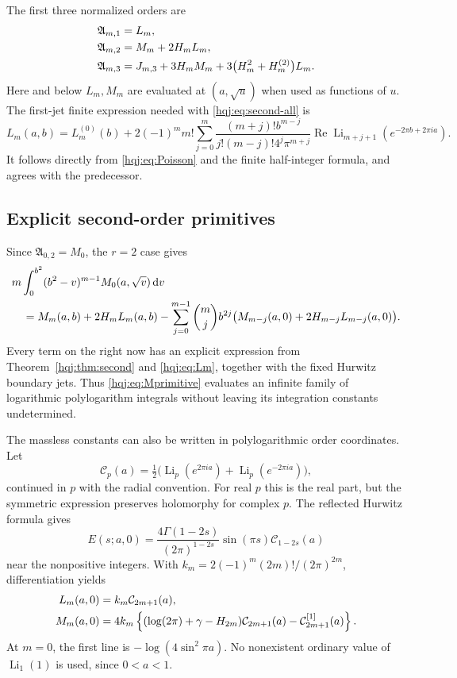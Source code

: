 \documentclass[11pt,letterpaper]{article}
\numberwithin{equation}{section}
\theoremstyle{definition}
\newcommand{\Li}{\operatorname{Li}}
\newcommand{\Rea}{\operatorname{Re}}
\newcommand{\dd}{\,\mathrm{d}}
\begin{document}
The first three normalized orders are
\begin{align}
\mathfrak A_{m,1}&=L_m,\notag\\
\mathfrak A_{m,2}&=M_m+2H_mL_m,\label{hqj:eq:normalized-low}\\
\mathfrak A_{m,3}&=J_{m,3}+3H_mM_m
+3\bigl(H_m^2+H_m^{(2)}\bigr)L_m.\notag
\end{align}
Here and below $L_m,M_m$ are evaluated at $(a,\sqrt u)$ when used as
functions of $u$. The first-jet finite expression needed with
\eqref{hqj:eq:second-all} is
\begin{equation}\label{hqj:eq:Lm}
L_m(a,b)=L_m^{(0)}(b)+2(-1)^m m!
\sum_{j=0}^m\frac{(m+j)!b^{m-j}}{j!(m-j)!4^j\pi^{m+j}}
\Rea\Li_{m+j+1}(e^{-2\pi b+2\pi ia}).
\end{equation}
It follows directly from \eqref{hqj:eq:Poisson} and the finite
half-integer formula, and agrees with the predecessor.

\subsection{Explicit second-order primitives}
Since $\mathfrak A_{0,2}=M_0$, the $r=2$ case gives
\begin{align}
&m\int_0^{b^2}(b^2-v)^{m-1}M_0(a,\sqrt v)\dd v\notag\\
&\quad=M_m(a,b)+2H_mL_m(a,b)
-\sum_{j=0}^{m-1}\binom mj b^{2j}
\bigl(M_{m-j}(a,0)+2H_{m-j}L_{m-j}(a,0)\bigr).
\label{hqj:eq:Mprimitive}
\end{align}
Every term on the right now has an explicit expression from
Theorem~\ref{hqj:thm:second} and \eqref{hqj:eq:Lm}, together with the
fixed Hurwitz boundary jets. Thus \eqref{hqj:eq:Mprimitive} evaluates
an infinite family of logarithmic polylogarithm integrals without
leaving its integration constants undetermined.

The massless constants can also be written in polylogarithmic order
coordinates. Let
\[
\mathcal C_p(a)=\tfrac12\bigl(\Li_p(e^{2\pi ia})+
\Li_p(e^{-2\pi ia})\bigr),
\]
continued in $p$ with the radial convention. For real $p$ this is the
real part, but the symmetric expression preserves holomorphy for
complex $p$. The reflected Hurwitz formula \cite{hurwitz} gives
\begin{equation}\label{hqj:eq:massless-functional}
E(s;a,0)=\frac{4\Gamma(1-2s)}{(2\pi)^{1-2s}}
\sin(\pi s)\mathcal C_{1-2s}(a)
\end{equation}
near the nonpositive integers. With
$k_m=2(-1)^m(2m)!/(2\pi)^{2m}$, differentiation yields
\begin{align}
L_m(a,0)&=k_m\mathcal C_{2m+1}(a),\notag\\
M_m(a,0)&=4k_m\left\{
(\log(2\pi)+\gamma-H_{2m})\mathcal C_{2m+1}(a)
-\mathcal C_{2m+1}^{[1]}(a)\right\}.
\label{hqj:eq:massless-second}
\end{align}
At $m=0$, the first line is $-\log(4\sin^2\pi a)$.
No nonexistent ordinary value of $\Li_1(1)$ is used, since $0<a<1$.
\end{document}
